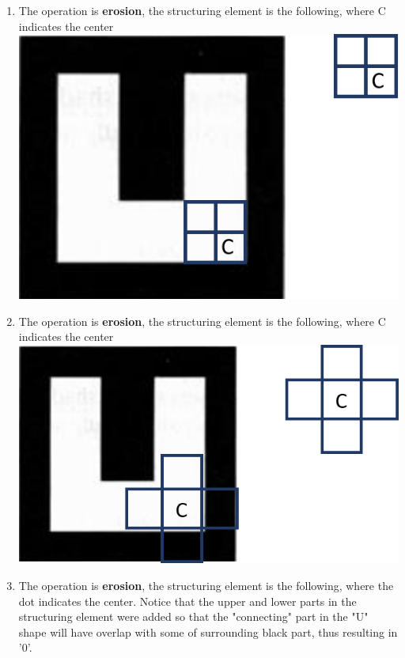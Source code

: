 \documentclass[a4paper]{iacas}
\begin{document}
\begin{enumerate}[label=(\alph*.)]

\item The operation is \textbf{erosion}, the structuring element is the following, where C indicates the center
\newline
\newline
\includegraphics{imgs/q3_11.png}
\item The operation is \textbf{erosion}, the structuring element is the following, where C indicates the center
\newline
\newline
\includegraphics{imgs/q3_12.png}
\item The operation is \textbf{erosion}, the structuring element is the following, where the dot indicates the center. Notice that the upper and lower parts in the structuring element were added so that the "connecting" part in the "U" shape will have overlap with some of surrounding black part, thus resulting in '0'.

\end{enumerate}
\end{document}
